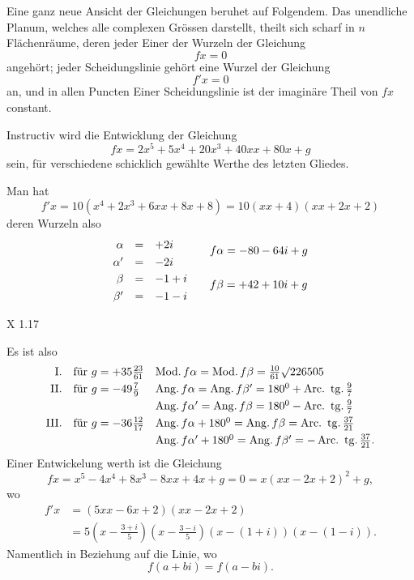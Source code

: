 \NoSourceHead
{}
\noindent\hspace*{\parindent}Eine ganz neue Ansicht der Gleichungen beruhet auf Folgendem. Das
unendliche Planum, welches alle complexen Grössen darstellt, theilt sich scharf
in $n$ Flächenräume, deren jeder Einer der Wurzeln der Gleichung
\[
fx=0
\]
angehört; jeder Scheidungslinie gehört eine Wurzel der Gleichung
\[
f'x=0
\]
an, und in allen Puncten Einer Scheidungslinie ist der imaginäre Theil von
$fx$ constant.

Instructiv wird die Entwicklung der Gleichung
\[
fx=2x^5+5x^4+20x^3+40xx+80x+g
\]
sein, für verschiedene schicklich gewählte Werthe des letzten Gliedes.

Man hat
\[
f'x=10(x^4+2x^3+6xx+8x+8)=10(xx+4)(xx+2x+2)
\]
deren Wurzeln also
\[
\begin{array}{rcl@{\qquad}l}
\alpha&=&+2i&\raisebox{-1.2ex}{$f\alpha=-80-64i+g$}\\
\alpha'&=&-2i&\\[.6ex]
\beta&=&-1+i&\raisebox{-1.2ex}{$f\beta=+42+10i+g$}\\
\beta'&=&-1-i&
\end{array}
\]
\par\vfill\noindent X 1.\hfill17\par
\clearpage
{}
\noindent Es ist also
\[
\begin{array}{r@{\quad}l@{\quad}l}
\mathrm{I.}&\text{für }g=+35\tfrac{23}{61}&\operatorname{Mod.}f\alpha=\operatorname{Mod.}f\beta=\tfrac{10}{61}\surd226505\\[.7ex]
\mathrm{II.}&\text{für }g=-49\tfrac79&\operatorname{Ang.}f\alpha=\operatorname{Ang.}f\beta'=180^0+\operatorname{Arc.\ tg.}\tfrac97\\[.7ex]
&&\operatorname{Ang.}f\alpha'=\operatorname{Ang.}f\beta=180^0-\operatorname{Arc.\ tg.}\tfrac97\\[.7ex]
\mathrm{III.}&\text{für }g=-36\tfrac{12}{17}&\operatorname{Ang.}f\alpha+180^0=\operatorname{Ang.}f\beta=\operatorname{Arc.\ tg.}\tfrac{37}{21}\\[.7ex]
&&\operatorname{Ang.}f\alpha'+180^0=\operatorname{Ang.}f\beta'=-\operatorname{Arc.\ tg.}\tfrac{37}{21}.
\end{array}
\]
\noindent\hspace*{\parindent}Einer Entwickelung werth ist die Gleichung
\[
fx=x^5-4x^4+8x^3-8xx+4x+g=0=x(xx-2x+2)^2+g,
\]
wo
\[
\begin{aligned}
f'x&=(5xx-6x+2)(xx-2x+2)\\
&=5\left(x-\frac{3+i}{5}\right)\left(x-\frac{3-i}{5}\right)(x-(1+i))(x-(1-i)).
\end{aligned}
\]
Namentlich in Beziehung auf die Linie, wo
\[
f(a+bi)=f(a-bi).
\]
\ClosingRule
